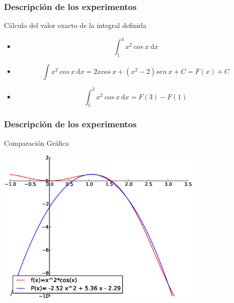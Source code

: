 \documentclass{beamer}
\begin{document}
\begin{frame}

  \frametitle{Descripción de los experimentos}
  
  \begin{block}{Cálculo del valor exacto de la integral definida}
    \begin{itemize}[<+->]
     \item \[ \int_{1}^{3} x^2\ cos\ x\ \text{d}x  \]
     \item \[ \int x^2\ cos\ x\ \text{d}x = 2x cos\ x + (x^2 -2)sen\ x +C=F(x)+C\]
     \item \[ \int_{1}^{3} x^2\ cos\ x\ \text{d}x = F(3)-F(1)\]
    \end{itemize}   
  \end{block}

\end{frame}
\begin{frame}

  \frametitle{Descripción de los experimentos}
  
  \begin{block}{Comparación Gráfica}
    \begin{center}
      \includegraphics[width=0.75\textwidth]{img/grafica2.eps}
    \end{center}
  \end{block}
 
\end{frame}
\end{document}
